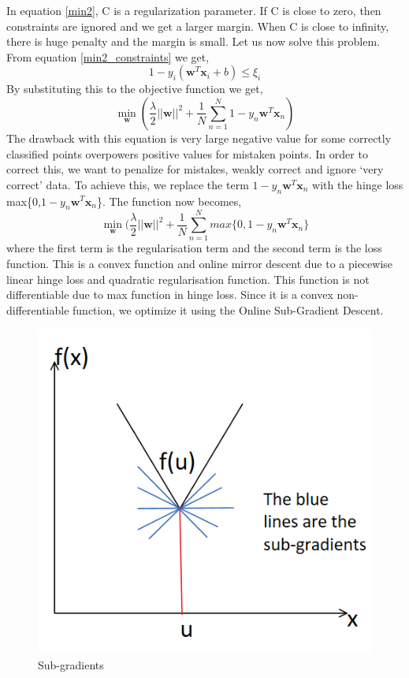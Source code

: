 \documentclass[11pt]{article}
\begin{document}
In equation \ref{min2}, C is a regularization parameter. If C is close to zero, then constraints are ignored and we get a larger margin. When C is close to infinity, there is huge penalty and the margin is small. Let us now solve this problem. \\From equation \ref{min2_constraints} we get,
\begin{equation}
    \label{slack}
1- y_i(\mathbf{w}^{T}\mathbf{x}_i+b)\leq \xi_i
\end{equation}
 By substituting this to the objective function we get,
 \begin{equation}
    \label{slack}\min_\mathbf{w}(\frac{\lambda}{2}||\mathbf{w}||^2+\frac{1}{N}\sum_{n=1}^{N}1-y_n\mathbf{w}^T\mathbf{x}_n)
    \end{equation}
  The drawback with this equation is very large negative value for some correctly classified points overpowers positive values for mistaken points. In order to correct this, we want to penalize for mistakes, weakly correct and ignore ‘very correct’ data.
To achieve this, we replace the term $1-y_n\mathbf{w}^T\mathbf{x}_n$ with the hinge loss max\{0,$1-y_n\mathbf{w}^T\mathbf{x}_n$\}. The function now becomes,\begin{equation}
    \label{function}
    \min_\mathbf{w}(\frac{\lambda}{2}||\mathbf{w}||^2+\frac{1}{N}\sum_{n=1}^{N}max\{0,1-y_n\mathbf{w}^T\mathbf{x}_n\} 
    \end{equation}
where the first term is the regularisation term and the second term is the loss function. This is a convex function and online mirror descent due to a piecewise linear hinge loss and quadratic regularisation function. This function is not differentiable due to max function in hinge loss. Since it is a convex non-differentiable function, we optimize it using the Online Sub-Gradient Descent.
\begin{figure}[h!]
    \centering
  \includegraphics[scale=0.7]{fig6.PNG}
  \caption{Sub-gradients}
  \label{fig:SG}
\end{figure}
\end{document}
